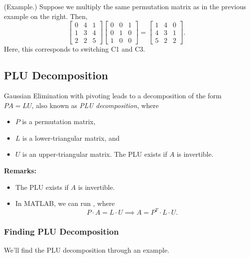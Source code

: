 \documentclass[letterpaper]{article}
\newcommand{\0}{\mathbf{0}}
\begin{document}
\begin{mdframed}
    (Example.) Suppose we multiply the same permutation matrix as in the previous example on the right. Then, 
    \[\begin{bmatrix}
        0 & 4 & 1 \\ 
        1 & 3 & 4 \\ 
        2 & 2 & 5
    \end{bmatrix} \begin{bmatrix}
        0 & 0 & 1 \\ 
        0 & 1 & 0 \\ 
        1 & 0 & 0
    \end{bmatrix} = \begin{bmatrix}
        1 & 4 & 0 \\ 
        4 & 3 & 1 \\ 
        5 & 2 & 2
    \end{bmatrix}.\]
    Here, this corresponds to switching C1 and C3. 
\end{mdframed}

\subsection{PLU Decomposition}
Gaussian Elimination with pivoting leads to a decomposition of the form $PA = LU$, also known as \emph{PLU decomposition}, where 
\begin{itemize}
    \item $P$ is a permutation matrix,
    \item $L$ is a lower-triangular matrix, and 
    \item $U$ is an upper-triangular matrix. The PLU exists if $A$ is invertible. 
\end{itemize}
\textbf{Remarks:}
\begin{itemize}
    \item The PLU exists if $A$ is invertible. 
    \item In MATLAB, we can run , where 
    \[P \cdot A = L \cdot U \implies A = P^T \cdot L \cdot U.\]
\end{itemize}

\subsubsection{Finding PLU Decomposition}
We'll find the PLU decomposition through an example. 
\end{document}
